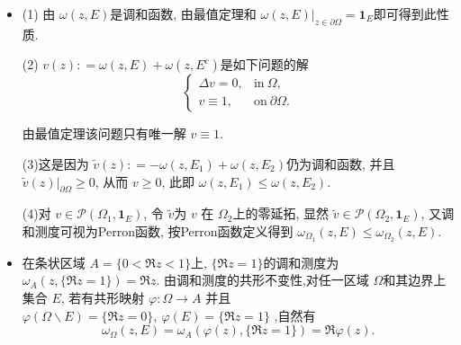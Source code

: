 \begin{itemize}
代入即得 $g(z_1,z_2) = g(z_2,z_1)$.

    \item[4.3.3]

(1) 由 $\omega(z,E)$是调和函数, 由最值定理和 
$\omega(z,E)|_{z\in \partial \Omega} = \boldsymbol{1}_{E}$即可得到此性质.

(2) $v(z): = \omega(z,E) + \omega(z,E^{c})$是如下问题的解
$$\begin{cases} \Delta v = 0, & \text{in}\ \Omega, \\  
    v\equiv 1,&   \text{on}\ \partial\Omega.\end{cases}$$
 
由最值定理该问题只有唯一解 $v\equiv 1.$

(3)这是因为 $\tilde{v} (z): = -\omega(z,E_1) + \omega(z,E_2) $仍为调和函数, 
并且 $\tilde{v} (z)|_{\partial \Omega}\ge 0$, 从而 $v\ge 0$, 
此即 $\omega(z,E_1)\le \omega(z,E_2).$

(4)对 $v \in \mathcal{P}(\Omega_1, \boldsymbol{1}_{E})$, 
令 $\tilde{v}$为 $v$ 在  $\Omega_2$上的零延拓, 
显然 $\tilde{v}\in \mathcal{P}(\Omega_2, \boldsymbol{1}_{E}) $, 
又调和测度可视为Perron函数, 按Perron函数定义得到  
$\omega_{\Omega_1}(z,E)\le \omega_{\Omega_2}(z,E)$.


    \item[4.3.4]

 在条状区域 $A = \{0<\Re z<1\}$上, $\{\Re z = 1\}$的调和测度为 
 $\omega_{A}(z,\{\Re z = 1\}) = \Re z$. 
 由调和测度的共形不变性,对任一区域 $\Omega$和其边界上集合 $E$, 
 若有共形映射 $\varphi: \Omega\to A$ 
 并且 $\varphi(\Omega\backslash E) = \{\Re z = 0\},
 \ \varphi(E) = \{\Re z = 1\}$ ,自然有
$$\omega_{\Omega}(z,E) = \omega_{A}(\varphi(z),\{\Re z = 1\}) 
= \Re\varphi(z).$$


\end{itemize}
